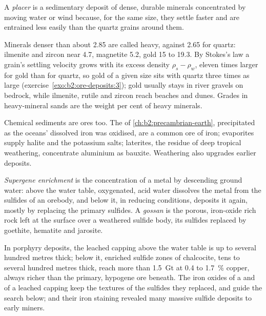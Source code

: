 \begin{definition}[Placer]\label{def:b2:ore-deposits:placer}
A \emph{placer} is a sedimentary deposit of dense, durable minerals concentrated by
moving water or wind because, for the same size, they settle faster and are entrained less easily
than the quartz grains around them.
\end{definition}

Minerals denser than about 2.85 are called heavy, against 2.65 for quartz: ilmenite and zircon
near 4.7, magnetite 5.2, gold 15 to 19.3. By Stokes's law a grain's settling velocity grows with
its excess density $\rho_s - \rho_w$, eleven times larger for gold than for quartz, so gold of a
given size sits with quartz three times as large (exercise~\ref{exo:b2:ore-deposits:3}); gold
usually stays in river gravels on bedrock, while ilmenite, rutile and zircon reach beaches and
dunes. Grades in heavy-mineral sands are the weight per cent of heavy minerals.

Chemical sediments are ores too. The  of \cref{ch:b2:precambrian-earth},
precipitated as the oceans' dissolved iron was oxidised, are a common ore of iron; evaporites
supply halite and the potassium salts; laterites, the residue of deep tropical weathering,
concentrate aluminium as bauxite. Weathering also upgrades earlier deposits.

\begin{definition}\label{def:b2:ore-deposits:supergene}
\emph{Supergene enrichment} is the concentration of a metal by
descending ground water: above the water table, oxygenated, acid water dissolves the metal from the
sulfides of an orebody, and below it, in reducing conditions, deposits it again, mostly by
replacing the primary sulfides. A \emph{gossan} is the porous, iron-oxide rich rock
left at the surface over a weathered sulfide body, its sulfides replaced by goethite, hematite and
jarosite.
\end{definition}

In porphyry deposits, the leached capping above the water table is up to several hundred metres
thick; below it, enriched sulfide zones of chalcocite, tens to several hundred metres thick, reach
more than \qty{1.5}{Gt} at 0.4 to \qty{1.7}{\percent} copper, always richer than the primary,
hypogene ore beneath. The iron oxides of a  and of a leached capping keep the textures of the
sulfides they replaced, and guide the search below;  and their iron staining revealed many
massive sulfide deposits to early miners.

